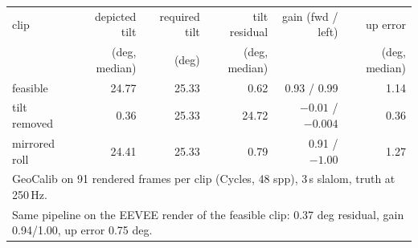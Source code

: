 \begin{tabular}{lrrrrr}
\toprule
clip & depicted tilt & required tilt & tilt residual & gain (fwd / left) & up error \\
 & (deg, median) & (deg) & (deg, median) & & (deg, median) \\
\midrule
feasible        & 24.77 & 25.33 & 0.62  & 0.93 / 0.99      & 1.14 \\
tilt removed    & 0.36  & 25.33 & 24.72 & $-0.01$ / $-0.004$ & 0.36 \\
mirrored roll   & 24.41 & 25.33 & 0.79  & 0.91 / $-1.00$   & 1.27 \\
\midrule
\multicolumn{6}{l}{\footnotesize GeoCalib on 91 rendered frames per clip (Cycles, 48 spp), 3\,s slalom, truth at 250\,Hz.}\\
\multicolumn{6}{l}{\footnotesize Same pipeline on the EEVEE render of the feasible clip: 0.37 deg residual, gain 0.94/1.00, up error 0.75 deg.}\\
\bottomrule
\end{tabular}
